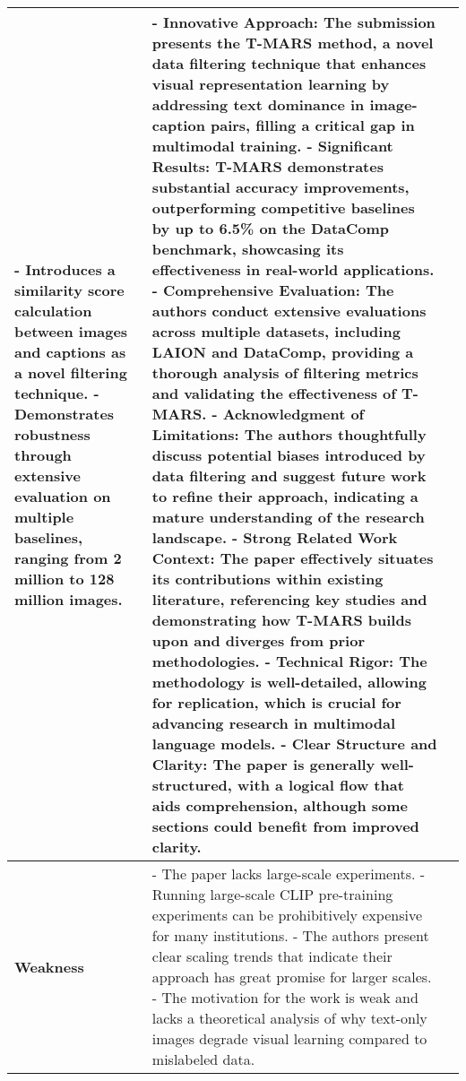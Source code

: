 \begin{table*}[htbp]
\begin{tabular}{p{3cm}p{6cm}p{6cm}}
- Introduces a similarity score calculation between images and captions as a novel filtering technique.\newline
- Demonstrates robustness through extensive evaluation on multiple baselines, ranging from 2 million to 128 million images.
& 
- Innovative Approach: The submission presents the T-MARS method, a novel data filtering technique that enhances visual representation learning by addressing text dominance in image-caption pairs, filling a critical gap in multimodal training.\newline
- Significant Results: T-MARS demonstrates substantial accuracy improvements, outperforming competitive baselines by up to 6.5\% on the DataComp benchmark, showcasing its effectiveness in real-world applications.\newline
- Comprehensive Evaluation: The authors conduct extensive evaluations across multiple datasets, including LAION and DataComp, providing a thorough analysis of filtering metrics and validating the effectiveness of T-MARS.\newline
- Acknowledgment of Limitations: The authors thoughtfully discuss potential biases introduced by data filtering and suggest future work to refine their approach, indicating a mature understanding of the research landscape.\newline
- Strong Related Work Context: The paper effectively situates its contributions within existing literature, referencing key studies and demonstrating how T-MARS builds upon and diverges from prior methodologies.\newline
- Technical Rigor: The methodology is well-detailed, allowing for replication, which is crucial for advancing research in multimodal language models.\newline
- Clear Structure and Clarity: The paper is generally well-structured, with a logical flow that aids comprehension, although some sections could benefit from improved clarity.
\\ \midrule
\textbf{Weakness} & 
- The paper lacks large-scale experiments.\newline
- Running large-scale CLIP pre-training experiments can be prohibitively expensive for many institutions.\newline
- The authors present clear scaling trends that indicate their approach has great promise for larger scales.\newline
- The motivation for the work is weak and lacks a theoretical analysis of why text-only images degrade visual learning compared to mislabeled data.\newline

\end{tabular}
\end{table*}
